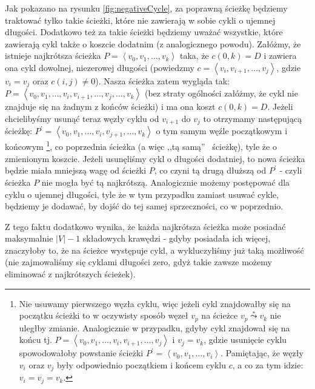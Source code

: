Jak pokazano na rysunku \ref{fig:negativeCycle}, za poprawną ścieżkę będziemy traktować tylko takie ścieżki, które nie zawierają w sobie cykli o ujemnej długości. Dodatkowo też za takie ścieżki będziemy uważać wszystkie, które zawierają cykl także o koszcie dodatnim (z analogicznego powodu). Załóżmy, że istnieje najkrótsza ścieżka $P = \left \langle v_{0}, v_{1}, \ldots, v_{k} \right \rangle $ taka, że $c \left( 0, k \right) = D$ i zawiera ona cykl dowolnej, niezerowej długości (powiedzmy $c = \left \langle v_{i}, v_{i+1}, \ldots, v_{j} \right \rangle $, gdzie $v_{i} = v_{j} $ oraz $c \left( i, j \right) \neq 0$). Nasza ścieżka zatem wygląda tak: $P = \left \langle v_{0}, v_{1}, \ldots, v_{i}, v_{i+1}, \ldots, v_{j}, \ldots, v_{k} \right \rangle $ (bez straty ogólności załóżmy, że cykl nie znajduje się na żadnym z końców ścieżki) i ma ona koszt $c \left( 0, k \right) = D$. Jeżeli chcielibyśmy usunąć teraz węzły cyklu od $v_{i+1}$ do $v_{j}$ to otrzymamy następującą ścieżkę: $P^{'} = \left \langle v_{0}, v_{1}, \ldots, v_{i}, v_{j+1}, \ldots, v_{k} \right \rangle $ o tym samym węźle początkowym i końcowym \footnote{Nie usuwamy pierwszego węzła cyklu, więc jeżeli cykl znajdowałby się na początku ścieżki to w oczywisty sposób węzeł $v_{p}$ na ścieżce $v_{p} \overset{*}\leadsto v_{k}$ nie uległby zmianie. Analogicznie w przypadku, gdyby cykl znajdował się na końcu tj. $P = \left \langle v_{0}, v_{1}, \ldots, v_{i}, v_{i+1}, \ldots, v_{j} \right \rangle $ i $v_{j}=v_{k}$, gdzie usunięcie cyklu spowodowałoby powstanie ścieżki  $P^{'} = \left \langle v_{0}, v_{1}, \ldots, v_{i} \right \rangle $. Pamiętając, że węzły $v_{i}$ oraz $v_{j}$ były odpowiednio początkiem i końcem cyklu $c$, a co za tym idzie: $v_{i} = v_{j} = v_{k} $.}, co poprzednia ścieżka (a więc ,,tą samą''~ ścieżkę), tyle że o zmienionym koszcie. Jeżeli usunęliśmy cykl o długości dodatniej, to nowa ścieżka będzie miała mniejszą wagę od ścieżki $P$, co czyni tą drugą dłuższą od $P^{'}$ - czyli ścieżka $P$ nie mogła być tą najkrótszą. Analogicznie możemy postępować dla cyklu o ujemnej długości, tyle że w tym przypadku zamiast usuwać cykle, będziemy je dodawać, by dojść do tej samej sprzeczności, co w poprzednio.

Z tego faktu dodatkowo wynika, że każda najkrótsza ścieżka może posiadać maksymalnie $\left| V \right| - 1$ składowych krawędzi - gdyby posiadała ich więcej, znaczyłoby to, że na ścieżce występuje cykl, a wykluczyliśmy już taką możliwość (nie zajmowaliśmy się cyklami długości zero, gdyż takie zawsze możemy eliminować z najkrótszych ścieżek).

